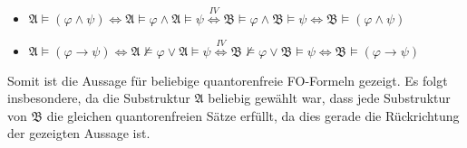 \documentclass[11pt, a4paper]{article}
\begin{document}
\begin{adjustwidth}{20pt}{20pt}
\begin{itemize}
	\item $\mathfrak{A} \models (\varphi \wedge \psi) \Leftrightarrow \mathfrak{A} \models \varphi \wedge \mathfrak{A} \models \psi \overset{IV}{\Leftrightarrow}
		\mathfrak{B} \models \varphi \wedge \mathfrak{B} \models \psi \Leftrightarrow \mathfrak{B} \models (\varphi \wedge \psi)$
	\item $\mathfrak{A} \models (\varphi \rightarrow \psi) \Leftrightarrow \mathfrak{A} \not\models \varphi \vee \mathfrak{A} \models \psi \overset{IV}{\Leftrightarrow}
		\mathfrak{B} \not\models \varphi \vee \mathfrak{B} \models \psi \Leftrightarrow \mathfrak{B} \models (\varphi \rightarrow \psi)$
	\end{itemize}
Somit ist die Aussage für beliebige quantorenfreie FO-Formeln gezeigt. Es folgt insbesondere, da die Substruktur $\mathfrak{A}$ beliebig gewählt war, dass jede Substruktur von
$\mathfrak{B}$ die gleichen quantorenfreien Sätze erfüllt, da dies gerade die Rückrichtung der gezeigten Aussage ist.
\end{adjustwidth}
\end{document}
